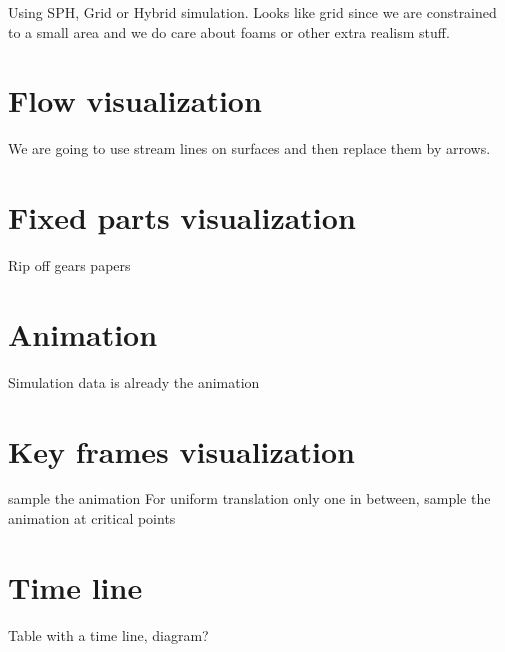 Using SPH, Grid or Hybrid simulation.
Looks like grid since we are constrained to a small area and we do care about foams or other extra realism stuff.

\section{Flow visualization}

We are going to use stream lines on surfaces and then replace them by arrows.

\section{Fixed parts visualization}

Rip off gears papers

\section{Animation}

Simulation data is already the animation

\section{Key frames visualization}

sample the animation
For uniform translation only one in between, sample the animation at critical points

\section{Time line}

Table with a time line, diagram?